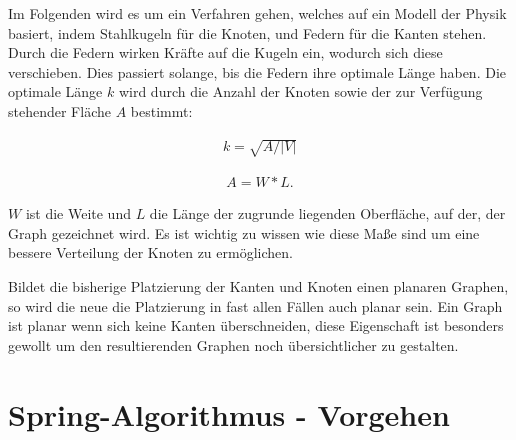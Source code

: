 Im Folgenden wird es um ein Verfahren gehen, welches auf ein Modell
der Physik basiert, indem Stahlkugeln für die Knoten, und Federn für die Kanten stehen. Durch die 
Federn wirken Kräfte auf die Kugeln ein, wodurch sich diese verschieben. Dies passiert solange, 
bis die Federn ihre optimale Länge haben. Die optimale Länge $k$ wird durch die Anzahl der Knoten sowie
der zur Verfügung stehender Fläche $A$ bestimmt:

    \begin{align}
    	k =
    	\sqrt{A / |V|}
    \end{align}
    
    \begin{align}
    	A =
    	W * L.
    \end{align}

$W$ ist die Weite und $L$ die Länge der zugrunde liegenden Oberfläche, auf der, der Graph gezeichnet wird. Es ist
wichtig zu wissen wie diese Maße sind um eine bessere Verteilung der Knoten zu ermöglichen. 

Bildet die bisherige 
Platzierung der Kanten und Knoten einen planaren Graphen, so wird die neue die Platzierung in fast allen Fällen
auch planar sein. Ein Graph ist planar wenn sich keine Kanten überschneiden, diese Eigenschaft ist besonders gewollt um den resultierenden Graphen noch übersichtlicher zu gestalten.





\section{Spring-Algorithmus - Vorgehen}
\label{Kapitel_2_-_Unterkapitel_2}
%

